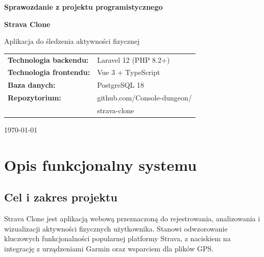 \documentclass[12pt,a4paper]{report}
\begin{document}
\begin{titlepage}
    \centering
    \vspace*{2cm}

    {\LARGE\bfseries Sprawozdanie z projektu programistycznego\par}
    \vspace{1.5cm}

    {\Huge\bfseries Strava Clone\par}
    \vspace{0.5cm}
    {\large Aplikacja do śledzenia aktywności fizycznej\par}

    \vspace{2cm}

    \begin{tabular}{ll}
        \textbf{Technologia backendu:}  & Laravel 12 (PHP 8.2+)       \\[4pt]
        \textbf{Technologia frontendu:} & Vue 3 + TypeScript           \\[4pt]
        \textbf{Baza danych:}           & PostgreSQL 18                \\[4pt]
        \textbf{Repozytorium:}          & github.com/Console-dungeon/ \\
                                        & strava-clone                 \\
    \end{tabular}

    \vfill

    {\large \today\par}
\end{titlepage}

\tableofcontents
\thispagestyle{empty}
\cleardoublepage

\chapter{Opis funkcjonalny systemu}
\label{ch:funkcjonalny}

\section{Cel i zakres projektu}

Strava Clone jest aplikacją webową przeznaczoną do rejestrowania, analizowania i wizualizacji aktywności fizycznych użytkownika. Stanowi odwzorowanie kluczowych funkcjonalności popularnej platformy Strava, z naciskiem na integrację z urządzeniami Garmin oraz wsparciem dla plików GPS.
\end{document}
